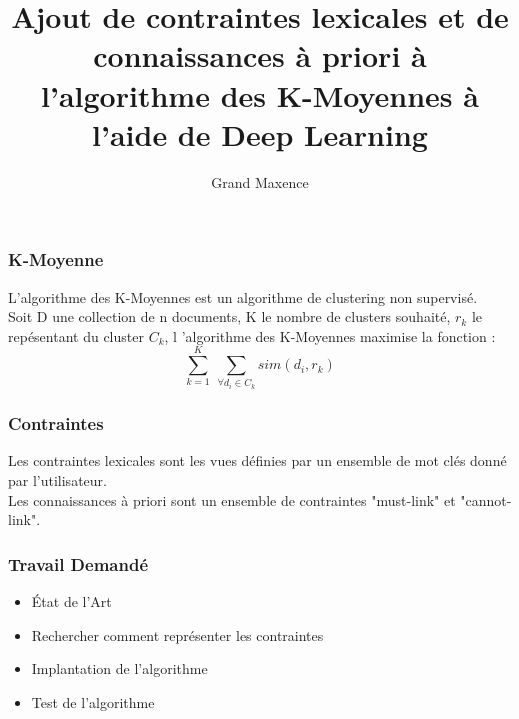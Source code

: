 \documentclass{beamer}
\begin{document}
\title{Ajout de contraintes lexicales et de connaissances \`a priori \`a l'algorithme  des K-Moyennes \`a l'aide de Deep Learning}
\author{Grand Maxence}

\maketitle

\begin{frame}
  \frametitle{K-Moyenne}

  L'algorithme des K-Moyennes est un algorithme de clustering non supervis\'e.
  \pause
  \\
  Soit D une collection de n documents, K le nombre de clusters souhait\'e, $r_k$
  le rep\'esentant du cluster $C_k$, l 'algorithme des  K-Moyennes maximise la fonction : 
\\
\[
\sum_{k=1}^K ~ \sum_{\forall d_i \in C_k} sim(d_i, r_k)
\]

\end{frame}

\begin{frame}
  \frametitle{Contraintes}
  Les contraintes lexicales sont les vues d\'efinies par un ensemble de mot cl\'es
  donn\'e par l'utilisateur.
  \pause
  \\
  Les connaissances \`a priori sont un ensemble de contraintes "must-link" et "cannot-link".
\end{frame}

\begin{frame}
  \frametitle{Travail Demand\'e}
  \begin{itemize}
  \item \'Etat de l'Art
  \item Rechercher comment repr\'esenter les contraintes
  \item Implantation de l'algorithme
  \item Test de l'algorithme
  \end{itemize}
\end{frame}
\end{document}
